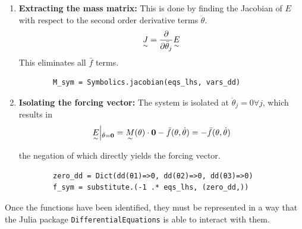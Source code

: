 \begin{enumerate}
    \item \textbf{Extracting the mass matrix: } This is done by finding the Jacobian of $E$ with respect to the second order derivative terms $\ddot\theta$.
        \begin{equation}
            \underset{\sim}{J} = \frac{\partial}{\partial \ddot\theta_j} \underset{\sim}{E}
        \end{equation}
        This eliminates all $\bar{f}$ terms.

        \begin{verbatim}
        M_sym = Symbolics.jacobian(eqs_lhs, vars_dd)
        \end{verbatim}

    \item \textbf{Isolating the forcing vector: } The system is isolated at $\ddot\theta_j = 0 \forall j$, which results in
        \begin{equation}
            \underset{\sim}{E}\Big\vert{}_{\ddot{\theta}=\mathbf{0}} =
            \underset{\sim}{M}(\theta)\cdot \mathbf{0} - \bar{f}(\theta, \dot{\theta}) =
            -\bar{f}(\theta, \dot{\theta})
        \end{equation}

        the negation of which directly yields the forcing vector.

        \begin{verbatim}
        zero_dd = Dict(dd(θ1)=>0, dd(θ2)=>0, dd(θ3)=>0)
        f_sym = substitute.(-1 .* eqs_lhs, (zero_dd,))
        \end{verbatim}
\end{enumerate}

Once the functions have been identified, they must be represented in a way that the Julia package \texttt{DifferentialEquations} is able to interact with them.

